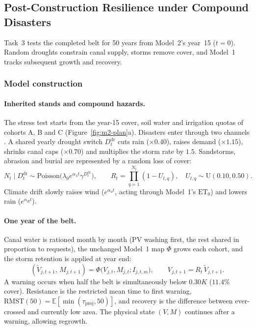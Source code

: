 \subsection{Post-Construction Resilience under Compound Disasters}\label{sec:model3}
Task~3 tests the completed belt for 50 years from Model~2's year~15 ($t=0$). Random droughts constrain canal supply, storms remove cover, and Model~1 tracks subsequent growth and recovery.

\subsubsection[Drought Rationing and Storm Damage]{Model construction}
\paragraph{Inherited stands and compound hazards.} The stress test starts from the year-15 cover, soil water and irrigation quotas of cohorts A, B and C (Figure~\ref{fig:m2-plan}a). Disasters enter through two channels \cite{EN14,EN15}. A shared yearly drought switch $D_t^{\mathrm{dr}}$ cuts rain ($\times0.40$), raises demand ($\times1.15$), shrinks canal caps ($\times0.70$) and multiplies the storm rate by $1.5$. Sandstorms, abrasion and burial are represented by a random loss of cover:
\begin{equation}\label{eq:m3-hazard}
N_t\mid D_t^{\mathrm{dr}}\sim\mathrm{Poisson}\big(\lambda_0 e^{\alpha_\lambda t}\gamma^{D_t^{\mathrm{dr}}}\big),\qquad
R_t=\prod_{q=1}^{N_t}(1-U_{t,q}),\quad U_{t,q}\sim\mathrm{U}(0.10,0.50).
\end{equation}
Climate drift slowly raises wind ($e^{\alpha_u t}$, acting through Model~1's $\mathrm{ET}_0$) and lowers rain ($e^{\alpha_R t}$).

\paragraph{One year of the belt.} Canal water is rationed month by month (PV washing first, the rest shared in proportion to requests), the unchanged Model~1 map $\Phi$ grows each cohort, and the storm retention is applied at year end:
\begin{equation}\label{eq:m3-step}
(\widetilde V_{j,t+1},\,M_{j,t+1})=\Phi\big(V_{j,t},M_{j,t};I_{j,t,m}\big),\qquad V_{j,t+1}=R_t\,\widetilde V_{j,t+1}.
\end{equation}
A warning occurs when half the belt is simultaneously below $0.30K$ ($11.4\%$ cover). Resistance is the restricted mean time to first warning, $\mathrm{RMST}(50)=\mathbb E[\min(\tau_{\mathrm{proj}},50)]$, and recovery is the difference between ever-crossed and currently low area. The physical state $(V,M)$ continues after a warning, allowing regrowth.

